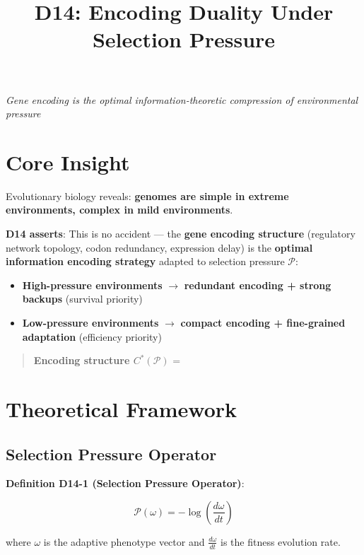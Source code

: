 \documentclass[12pt,a4paper]{article}
\title{\textbf{D14: Encoding Duality Under Selection Pressure}}
\author{}
\date{}
\newcommand{\calP}{\mathcal{P}}
\begin{document}
\maketitle

\begin{center}
\textit{Gene encoding is the optimal information-theoretic compression of environmental pressure}
\end{center}

\section{Core Insight}

Evolutionary biology reveals: \textbf{genomes are simple in extreme environments, complex in mild environments}.

\textbf{D14 asserts}: This is no accident --- the \textbf{gene encoding structure} (regulatory network topology, codon redundancy, expression delay) is the \textbf{optimal information encoding strategy} adapted to selection pressure $\calP$:
\begin{itemize}
    \item \textbf{High-pressure environments} $\rightarrow$ \textbf{redundant encoding + strong backups} (survival priority)
    \item \textbf{Low-pressure environments} $\rightarrow$ \textbf{compact encoding + fine-grained adaptation} (efficiency priority)
\end{itemize}

\begin{quote}
\textbf{Encoding structure $C^*(\calP)$} = 
\end{quote}

\section{Theoretical Framework}

\subsection{Selection Pressure Operator}

\textbf{Definition D14-1 (Selection Pressure Operator)}:

$$\calP(\omega) = -\log \left(\frac{d\omega}{dt}\right)$$

where $\omega$ is the adaptive phenotype vector and $\frac{d\omega}{dt}$ is the fitness evolution rate.
\end{document}
